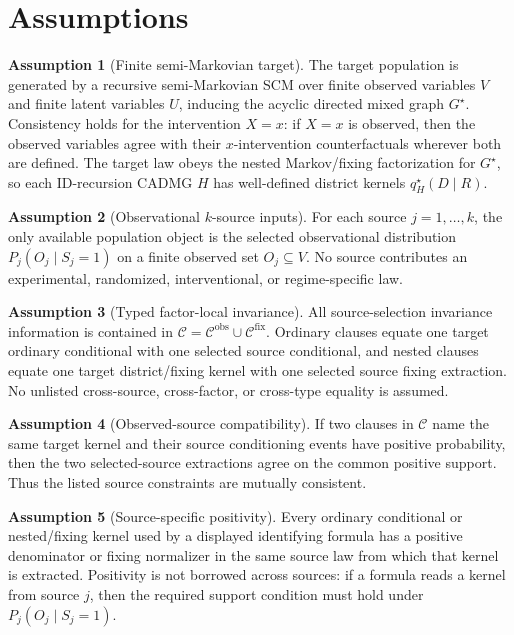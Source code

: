 \documentclass[11pt]{article}
\theoremstyle{definition}
\newtheorem{assumption}{Assumption}
\theoremstyle{plain}
\theoremstyle{remark}
\begin{document}
\section{Assumptions}
\begin{assumption}[Finite semi-Markovian target]\label{ass:finite-sm}
The target population is generated by a recursive semi-Markovian SCM over
finite observed variables \(V\) and finite latent variables \(U\), inducing
the acyclic directed mixed graph \(G^\star\).  Consistency holds for the
intervention \(X=x\): if \(X=x\) is observed, then the observed variables
agree with their \(x\)-intervention counterfactuals wherever both are defined.
The target law obeys the nested Markov/fixing factorization for
\(G^\star\), so each ID-recursion CADMG \(H\) has well-defined district
kernels \(q^\star_H(D\mid R)\).
\end{assumption}

\begin{assumption}[Observational \(k\)-source inputs]\label{ass:k-source-inputs}
For each source \(j=1,\ldots,k\), the only available population object is the
selected observational distribution \(P_j(O_j\mid S_j=1)\) on a finite
observed set \(O_j\subseteq V\).  No source contributes an experimental,
randomized, interventional, or regime-specific law.
\end{assumption}

\begin{assumption}[Typed factor-local invariance]\label{ass:factor-local-C}
All source-selection invariance information is contained in
\(\mathcal C=\mathcal C^{\mathrm{obs}}\cup\mathcal C^{\mathrm{fix}}\).
Ordinary clauses equate one target ordinary conditional with one selected
source conditional, and nested clauses equate one target district/fixing
kernel with one selected source fixing extraction.  No unlisted
cross-source, cross-factor, or cross-type equality is assumed.
\end{assumption}

\begin{assumption}[Observed-source compatibility]\label{ass:overlap-compat}
If two clauses in \(\mathcal C\) name the same target kernel and their source
conditioning events have positive probability, then the two selected-source
extractions agree on the common positive support.  Thus the listed source
constraints are mutually consistent.
\end{assumption}

\begin{assumption}[Source-specific positivity]\label{ass:source-positivity}
Every ordinary conditional or nested/fixing kernel used by a displayed
identifying formula has a positive denominator or fixing normalizer in the
same source law from which that kernel is extracted.  Positivity is not
borrowed across sources: if a formula reads a kernel from source \(j\), then
the required support condition must hold under \(P_j(O_j\mid S_j=1)\).
\end{assumption}
\end{document}
